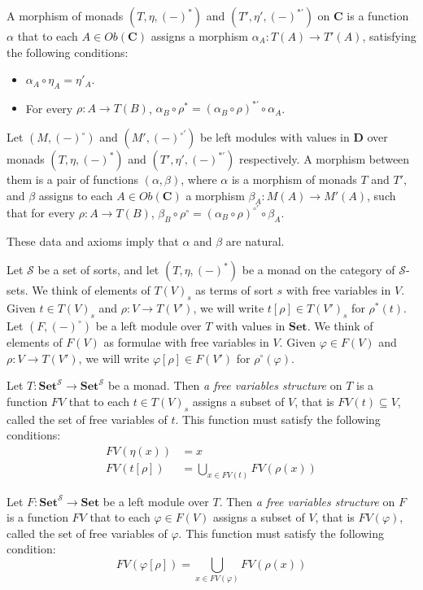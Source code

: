 \documentclass[reqno]{amsart}
\theoremstyle{definition}
\theoremstyle{remark}
\newcommand{\cat}[1]{\mathbf{#1}}
\newcommand{\C}{\cat{C}}
\newcommand{\D}{\cat{D}}
\newcommand{\Set}{\cat{Set}}
\numberwithin{figure}{section}
\begin{document}
\begin{defn}
A morphism of monads $(T,\eta,(-)^*)$ and $(T',\eta',(-)^{*'})$ on $\C$ is a function $\alpha$ that to each $A \in Ob(\C)$ assigns a morphism $\alpha_A : T(A) \to T'(A)$,
satisfying the following conditions:
\begin{itemize}
\item $\alpha_A \circ \eta_A = \eta'_A$.
\item For every $\rho : A \to T(B)$, $\alpha_B \circ \rho^* = (\alpha_B \circ \rho)^{*'} \circ \alpha_A$.
\end{itemize}

Let $(M,(-)^\circ)$ and $(M',(-)^{\circ'})$ be left modules with values in $\D$ over monads $(T,\eta,(-)^*)$ and $(T',\eta',(-)^{*'})$ respectively.
A morphism between them is a pair of functions $(\alpha,\beta)$, where $\alpha$ is a morphism of monads $T$ and $T'$,
and $\beta$ assigns to each $A \in Ob(\C)$ a morphism $\beta_A : M(A) \to M'(A)$,
such that for every $\rho : A \to T(B)$, $\beta_B \circ \rho^\circ = (\alpha_B \circ \rho)^{\circ'} \circ \beta_A$.
\end{defn}
These data and axioms imply that $\alpha$ and $\beta$ are natural.

Let $\mathcal{S}$ be a set of sorts, and let $(T,\eta,(-)^*)$ be a monad on the category of $\mathcal{S}$-sets.
We think of elements of $T(V)_s$ as terms of sort $s$ with free variables in $V$.
Given $t \in T(V)_s$ and $\rho : V \to T(V')$, we will write $t[\rho] \in T(V')_s$ for $\rho^*(t)$.
Let $(F,(-)^\circ)$ be a left module over $T$ with values in $\Set$.
We think of elements of $F(V)$ as formulae with free variables in $V$.
Given $\varphi \in F(V)$ and $\rho : V \to T(V')$, we will write $\varphi[\rho] \in F(V')$ for $\rho^\circ(\varphi)$.

Let $T : \Set^\mathcal{S} \to \Set^\mathcal{S}$ be a monad.
Then \emph{a free variables structure} on $T$ is a function $FV$ that to each $t \in T(V)_s$ assigns a subset of $V$, that is $FV(t) \subseteq V$, called the set of free variables of $t$.
This function must satisfy the following conditions:
\begin{align*}
FV(\eta(x)) & = x \\
FV(t[\rho]) & = \bigcup_{x \in FV(t)} FV(\rho(x))
\end{align*}

Let $F : \Set^\mathcal{S} \to \Set$ be a left module over $T$.
Then \emph{a free variables structure} on $F$ is a function $FV$ that to each $\varphi \in F(V)$ assigns a subset of $V$, that is $FV(\varphi)$, called the set of free variables of $\varphi$.
This function must satisfy the following condition:
\[ FV(\varphi[\rho]) = \bigcup_{x \in FV(\varphi)} FV(\rho(x)) \]
\end{document}
